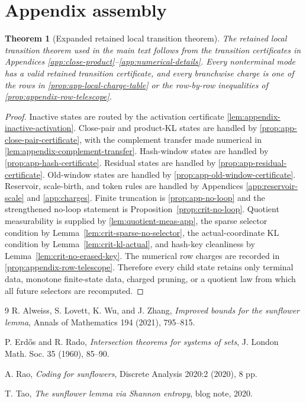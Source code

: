 \documentclass[11pt]{article}
\newcommand{\Cref}[1]{\ref{#1}}
\newtheorem{theorem}{Theorem}[section]
\theoremstyle{remark}
\begin{document}
\section{Appendix assembly}\label{app:assembly}

\begin{theorem}[Expanded retained local transition theorem]\label{thm:app-expanded-local}
The retained local transition theorem used in the main text follows from the transition certificates in Appendices \ref{app:close-product}--\ref{app:numerical-details}.  Every nonterminal mode has a valid retained transition certificate, and every branchwise charge is one of the rows in \Cref{prop:app-local-charge-table} or the row-by-row inequalities of \Cref{prop:appendix-row-telescope}.
\end{theorem}

\begin{proof}
Inactive states are routed by the activation certificate \Cref{lem:appendix-inactive-activation}.  Close-pair and product-KL states are handled by \Cref{prop:app-close-pair-certificate}, with the complement transfer made numerical in \Cref{lem:appendix-complement-transfer}.  Hash-window states are handled by \Cref{prop:app-hash-certificate}.  Residual states are handled by \Cref{prop:app-residual-certificate}.  Old-window states are handled by \Cref{prop:app-old-window-certificate}.  Reservoir, scale-birth, and token rules are handled by Appendices \ref{app:reservoir-scale} and \ref{app:charges}.  Finite truncation is \Cref{prop:app-no-loop} and the strengthened no-loop statement is Proposition~\ref{prop:crit-no-loop}.  Quotient measurability is supplied by \Cref{lem:quotient-meas-app}, the sparse selector condition by Lemma~\ref{lem:crit-sparse-no-selector}, the actual-coordinate KL condition by Lemma~\ref{lem:crit-kl-actual}, and hash-key cleanliness by Lemma~\ref{lem:crit-no-erased-key}.  The numerical row charges are recorded in \Cref{prop:appendix-row-telescope}.  Therefore every child state retains only terminal data, monotone finite-state data, charged pruning, or a quotient law from which all future selectors are recomputed.
\end{proof}

\begin{thebibliography}{9}
R. Alweiss, S. Lovett, K. Wu, and J. Zhang, \emph{Improved bounds for the sunflower lemma}, Annals of Mathematics 194 (2021), 795--815.

P. Erd\H{o}s and R. Rado, \emph{Intersection theorems for systems of sets}, J. London Math. Soc. 35 (1960), 85--90.

A. Rao, \emph{Coding for sunflowers}, Discrete Analysis 2020:2 (2020), 8 pp.

T. Tao, \emph{The sunflower lemma via Shannon entropy}, blog note, 2020.
\end{thebibliography}
\end{document}
